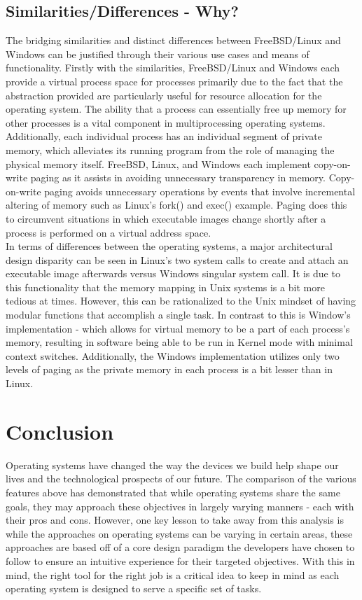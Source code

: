 \documentclass[letterpaper,10pt,titlepage]{article}
\begin{document}
\subsection{Similarities/Differences - Why?}

The bridging similarities and distinct differences between FreeBSD/Linux and Windows can be justified through their various use cases and means of functionality.  Firstly with the similarities, FreeBSD/Linux and Windows each provide a virtual process space for processes primarily due to the fact that the abstraction provided are particularly useful for resource allocation for the operating system.  The ability that a process can essentially free up memory for other processes is a vital component in multiprocessing operating systems.  Additionally, each individual process has an individual segment of private memory, which alleviates its running program from the role of managing the physical memory itself.  FreeBSD, Linux, and Windows each implement copy-on-write paging as it assists in avoiding unnecessary transparency in memory.  Copy-on-write paging avoids unnecessary operations by events that involve incremental altering of memory such as Linux's fork() and exec() example.  Paging does this to circumvent situations in which executable images change shortly after a process is performed on a virtual address space.\\

In terms of differences between the operating systems, a major architectural design disparity can be seen in Linux's two system calls to create and attach an executable image afterwards versus Windows singular system call.  It is due to this functionality that the memory mapping in Unix systems is a bit more tedious at times.  However, this can be rationalized to the Unix mindset of having modular functions that accomplish a single task.  In contrast to this is Window's implementation - which allows for virtual memory to be a part of each process's memory, resulting in software being able to be run in Kernel mode with minimal context switches.  Additionally, the Windows implementation utilizes only two levels of paging as the private memory in each process is a bit lesser than in Linux.\\

\section{Conclusion}

Operating systems have changed the way the devices we build help shape our lives and the technological prospects of our future.  The comparison of the various features above has demonstrated that while operating systems share the same goals, they may approach these objectives in largely varying manners - each with their pros and cons.  However, one key lesson to take away from this analysis is while the approaches on operating systems can be varying in certain areas, these approaches are based off of a core design paradigm the developers have chosen to follow to ensure an intuitive experience for their targeted objectives.  With this in mind, the right tool for the right job is a critical idea to keep in mind as each operating system is designed to serve a specific set of tasks.


\newpage


\end{document}

